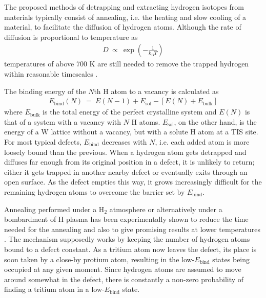 The proposed methods of detrapping and extracting hydrogen isotopes from materials typically consist of annealing, i.e. the heating and slow cooling of a material, to facilitate the diffusion of hydrogen atoms. 
Although the rate of diffusion is proportional to temperature as
\begin{align}
D ~\propto~ \exp\left(-\frac{1}{k_{\text{B}}T}\right)
\end{align}
temperatures of above 700 K are still needed to remove the trapped hydrogen within reasonable timescales \cite{heinola2017long}.

The binding energy of the $N$th H atom to a vacancy is calculated as
\begin{align}
E_{\text{bind}}(N) ~=~ E(N-1) + E_\text{sol} - [ E(N) + E_\text{bulk} ]
\end{align}
where $E_\text{bulk}$ is the total energy of the perfect crystalline system and $E(N)$ is that of a system with a vacancy with $N$ H atoms. 
$E_\text{sol}$, on the other hand, is the energy of a W lattice without a vacancy, but with a solute H atom at a TIS site.
For most typical defects, $E_{\text{bind}}$ decreases with $N$, i.e. each added atom is more loosely bound than the previous.
When a hydrogen atom gets detrapped and diffuses far enough from its original position in a defect, it is unlikely to return; either it gets trapped in another nearby defect or eventually exits through an open surface.
As the defect empties this way, it grows increasingly difficult for the remaining hydrogen atoms to overcome the barrier set by $E_{\text{bind}}$. 

Annealing performed under a H$_2$ atmosphere or alternatively under a bombardment of H plasma has been experimentally shown to reduce the time needed for the annealing and also to give promising results at lower temperatures \cite{alimov2011hydrogen, roth2013hydrogen, barton2014deuterium, ahlgren2019hydrogen}.
The mechanism supposedly works by keeping the number of hydrogen atoms bound to a defect constant.  
As a tritium atom now leaves the defect, its place is soon taken by a close-by protium atom, resulting in the low-$E_{\text{bind}}$ states being occupied at any given moment.
Since hydrogen atoms are assumed to move around somewhat in the defect, there is constantly a non-zero probability of finding a tritium atom in a low-$E_{\text{bind}}$ state.

